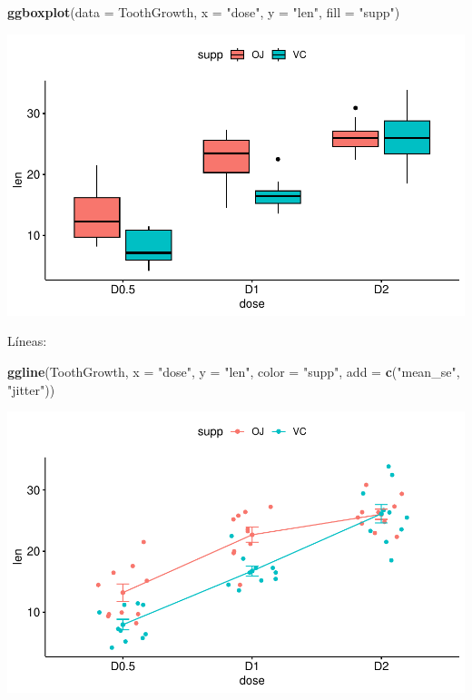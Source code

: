 \documentclass[
]{book}
\newenvironment{Shaded}{\begin{snugshade}}{\end{snugshade}}
\newcommand{\AttributeTok}[1]{\textcolor[rgb]{0.13,0.29,0.53}{#1}}
\newcommand{\FunctionTok}[1]{\textcolor[rgb]{0.13,0.29,0.53}{\textbf{#1}}}
\newcommand{\NormalTok}[1]{#1}
\newcommand{\StringTok}[1]{\textcolor[rgb]{0.31,0.60,0.02}{#1}}
\begin{document}
\begin{Shaded}
\begin{Highlighting}[]
\FunctionTok{ggboxplot}\NormalTok{(}\AttributeTok{data =}\NormalTok{ ToothGrowth, }\AttributeTok{x =} \StringTok{"dose"}\NormalTok{, }\AttributeTok{y =} \StringTok{"len"}\NormalTok{, }\AttributeTok{fill =} \StringTok{"supp"}\NormalTok{)}
\end{Highlighting}
\end{Shaded}

\includegraphics{R_Manual_files/figure-latex/unnamed-chunk-262-3.pdf}

Líneas:

\begin{Shaded}
\begin{Highlighting}[]
\FunctionTok{ggline}\NormalTok{(ToothGrowth, }\AttributeTok{x =} \StringTok{"dose"}\NormalTok{, }\AttributeTok{y =} \StringTok{"len"}\NormalTok{, }\AttributeTok{color =} \StringTok{"supp"}\NormalTok{, }\AttributeTok{add =} \FunctionTok{c}\NormalTok{(}\StringTok{"mean\_se"}\NormalTok{, }\StringTok{"jitter"}\NormalTok{))}
\end{Highlighting}
\end{Shaded}

\includegraphics{R_Manual_files/figure-latex/unnamed-chunk-263-1.pdf}
\end{document}
